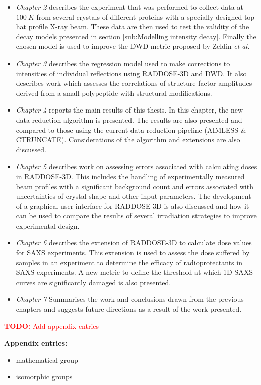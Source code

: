 	\begin{itemize}
        \item \textit{Chapter 2} describes the experiment that was performed to collect data at $100\ K$ from several crystals of different proteins with a specially designed top-hat profile X-ray beam.
		These data are then used to test the validity of the decay models presented in section \ref{sub:Modelling intensity decay}.
		Finally the chosen model is used to improve the DWD metric proposed by Zeldin \textit{et al.}
		\item \textit{Chapter 3} describes the regression model used to make corrections to intensities of individual reflections using RADDOSE-3D and DWD.
		It also describes work which assesses the correlations of structure factor amplitudes derived from a small polypeptide with structural modifications.
		\item \textit{Chapter 4} reports the main results of this thesis. In this chapter, the new data reduction algorithm is presented.
		The results are also presented and compared to those using the current data reduction pipeline (AIMLESS \& CTRUNCATE).
		Considerations of the algorithm and extensions are also discussed.
		\item \textit{Chapter 5} describes work on assessing errors associated with calculating doses in RADDOSE-3D.
		This includes the handling of experimentally measured beam profiles with a significant background count and errors associated with uncertainties of crystal shape and other input parameters.
		The development of a graphical user interface for RADDOSE-3D is also discussed and how it can be used to compare the results of several irradiation strategies to improve experimental design.
		\item \textit{Chapter 6} describes the extension of RADDOSE-3D to calculate dose values for SAXS experiments.
		This extension is used to assess the dose suffered by samples in an experiment to determine the efficacy of radioprotectants in SAXS experiments.
		A new metric to define the threshold at which 1D SAXS curves are significantly damaged is also presented.
		\item \textit{Chapter 7} Summarises the work and conclusions drawn from the previous chapters and suggests future directions as a result of the work presented.
    \end{itemize}

\textcolor{red}{
    \begin{myenumerate}
        \item \hypertarget{todo:Add appendix entries}{\textbf{TODO:} Add appendix entries}
    \end{myenumerate}
}

\textbf{Appendix entries:}
\newline
\begin{itemize}
    \item mathematical group
    \item isomorphic groups
\end{itemize}
